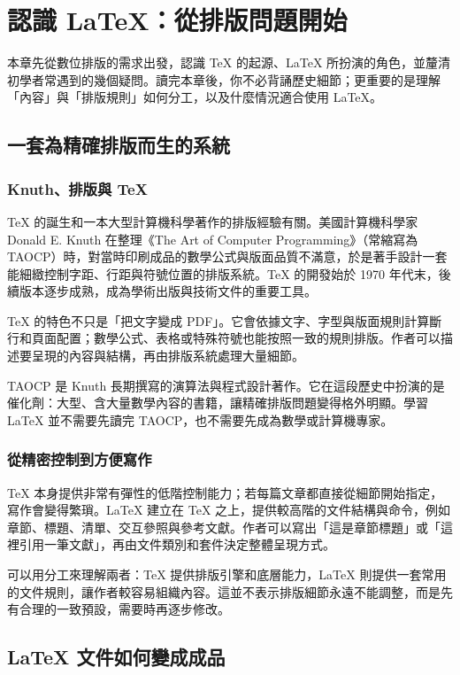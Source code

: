 \chapter{認識 LaTeX：從排版問題開始}

本章先從數位排版的需求出發，認識 TeX 的起源、LaTeX 所扮演的角色，並釐清初學者常遇到的幾個疑問。讀完本章後，你不必背誦歷史細節；更重要的是理解「內容」與「排版規則」如何分工，以及什麼情況適合使用 LaTeX。

\section{一套為精確排版而生的系統}

\subsection{Knuth、排版與 TeX}

TeX 的誕生和一本大型計算機科學著作的排版經驗有關。美國計算機科學家 Donald E. Knuth 在整理《The Art of Computer Programming》（常縮寫為 TAOCP）時，對當時印刷成品的數學公式與版面品質不滿意，於是著手設計一套能細緻控制字距、行距與符號位置的排版系統。TeX 的開發始於 1970 年代末，後續版本逐步成熟，成為學術出版與技術文件的重要工具。

TeX 的特色不只是「把文字變成 PDF」。它會依據文字、字型與版面規則計算斷行和頁面配置；數學公式、表格或特殊符號也能按照一致的規則排版。作者可以描述要呈現的內容與結構，再由排版系統處理大量細節。

TAOCP 是 Knuth 長期撰寫的演算法與程式設計著作。它在這段歷史中扮演的是催化劑：大型、含大量數學內容的書籍，讓精確排版問題變得格外明顯。學習 LaTeX 並不需要先讀完 TAOCP，也不需要先成為數學或計算機專家。

\subsection{從精密控制到方便寫作}

TeX 本身提供非常有彈性的低階控制能力；若每篇文章都直接從細節開始指定，寫作會變得繁瑣。LaTeX 建立在 TeX 之上，提供較高階的文件結構與命令，例如章節、標題、清單、交互參照與參考文獻。作者可以寫出「這是章節標題」或「這裡引用一筆文獻」，再由文件類別和套件決定整體呈現方式。

可以用分工來理解兩者：TeX 提供排版引擎和底層能力，LaTeX 則提供一套常用的文件規則，讓作者較容易組織內容。這並不表示排版細節永遠不能調整，而是先有合理的一致預設，需要時再逐步修改。

\section{LaTeX 文件如何變成成品}

